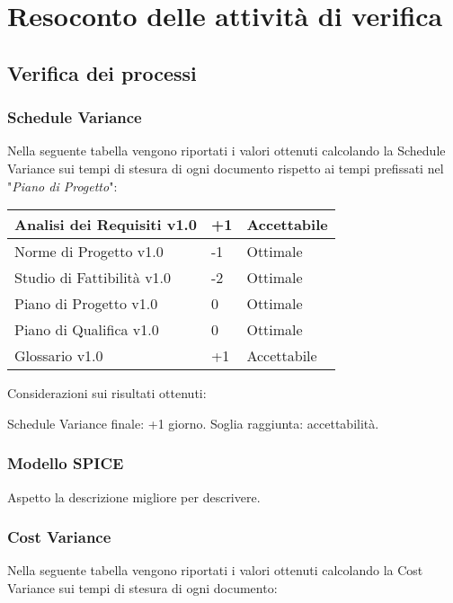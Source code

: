 \newpage
\section{Resoconto delle attività di verifica}
\subsection{Verifica dei processi}
\subsubsection{Schedule Variance}
Nella seguente tabella vengono riportati i valori ottenuti calcolando la Schedule Variance sui tempi di stesura di ogni documento rispetto ai tempi prefissati nel "\textit{Piano di Progetto}":

{
	\renewcommand{\arraystretch}{2}
	\centering
	\begin{tabular}{| L{4cm} | R{0.5cm} | C{3cm} |}
	\hline
	Analisi dei Requisiti v1.0 & +1 & Accettabile \\
	\hline
	Norme di Progetto v1.0 & -1 & Ottimale \\
	\hline
	Studio di Fattibilità v1.0 &  -2 &  Ottimale \\
	\hline
	Piano di Progetto v1.0 &  0 &  Ottimale\\
	\hline
	Piano di Qualifica v1.0 & 0 & Ottimale \\
	\hline
	Glossario v1.0 & +1 & Accettabile\\	
	\hline
	\end{tabular}
	
}

Considerazioni sui risultati ottenuti:

Schedule Variance finale: +1 giorno.
Soglia raggiunta: accettabilità.

\subsubsection{Modello SPICE}
Aspetto la descrizione migliore per descrivere.

\subsubsection{Cost Variance}
Nella seguente tabella vengono riportati i valori ottenuti calcolando la Cost Variance sui tempi di stesura di ogni documento:


